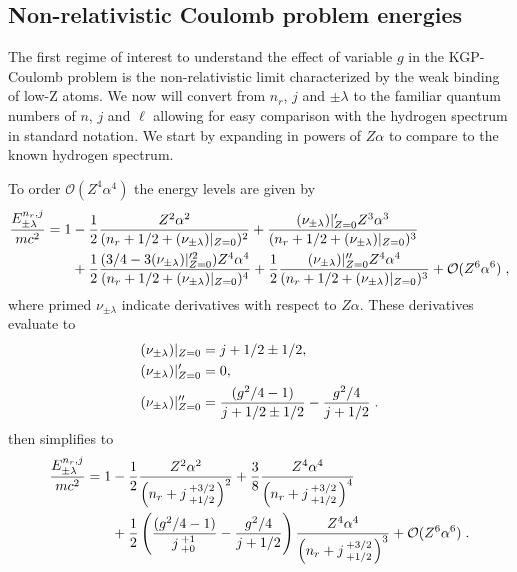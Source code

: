 \subsection{Non-relativistic Coulomb problem energies} \label{nonrel}
The first regime of interest to understand the effect of variable $g$ in the KGP-Coulomb problem is the non-relativistic limit characterized by the weak binding of low-Z atoms. We now will convert from $n_{r}$, $j$ and $\pm\lambda$ to the familiar quantum numbers of $n$, $j$ and $\ell$ allowing for easy comparison with the hydrogen spectrum in standard notation. We start by expanding  in powers of $Z\alpha$ to compare to the known hydrogen spectrum. 

To order $\mathcal{O}(Z^{4}\alpha^{4})$ the energy levels are given by
\begin{alignat}{1}
\label{nonrel01} \frac{E^{n_{r},j}_{\pm\lambda}}{mc^{2}}=1&-\frac{1}{2}\frac{Z^{2}\alpha^{2}}{(n_{r}+1/2+(\nu_{\pm\lambda})|_{Z=0})^{2}}+\frac{(\nu_{\pm\lambda})|_{Z=0}'Z^{3}\alpha^{3}}{(n_{r}+1/2+(\nu_{\pm\lambda})|_{Z=0})^{3}}\\ 
\notag&+\frac{1}{2}\frac{(3/4-3(\nu_{\pm\lambda})|_{Z=0}'^{2})Z^{4}\alpha^{4}}{(n_{r}+1/2+(\nu_{\pm\lambda})|_{Z=0})^{4}}+\frac{1}{2}\frac{(\nu_{\pm\lambda})|_{Z=0}^{\prime\prime} Z^{4}\alpha^{4}}{(n_{r}+1/2+(\nu_{\pm\lambda})|_{Z=0})^{3}}+\mathcal{O}(Z^{6}\alpha^{6})\;,\end{alignat}
where primed $\nu_{\pm\lambda}$ indicate derivatives with respect to $Z\alpha$. These derivatives evaluate to
\begin{alignat}{1}
\label{nonrel02} &(\nu_{\pm\lambda})|_{Z=0}=j+1/2\pm1/2,\\ \notag &(\nu_{\pm\lambda})|_{Z=0}'=0,\\ \notag &(\nu_{\pm\lambda})|_{Z=0}^{\prime\prime}=\frac{(g^{2}/4-1)}{j+1/2\pm1/2}-\frac{g^{2}/4}{j+1/2}\;.
\end{alignat}
 then simplifies to
\begin{alignat}{1}
\label{nonrel03} \frac{E^{n_{r},j}_{\pm\lambda}}{mc^{2}}=1&-\frac{1}{2}\frac{Z^{2}\alpha^{2}}{\left(n_{r}+j\begin{smallmatrix}+3/2 \\ +1/2\end{smallmatrix}\right)^{2}}+\frac{3}{8}\frac{Z^{4}\alpha^{4}}{\left(n_{r}+j\begin{smallmatrix}+3/2 \\ +1/2\end{smallmatrix}\right)^{4}}\\ 
\notag &+\frac{1}{2}\left(\frac{(g^{2}/4-1)}{j\begin{smallmatrix}+1 \\ +0\end{smallmatrix}}-\frac{g^{2}/4}{j+1/2}\right)\frac{Z^{4}\alpha^{4}}{\left(n_{r}+j\begin{smallmatrix}+3/2 \\ +1/2\end{smallmatrix}\right)^{3}}+\mathcal{O}(Z^{6}\alpha^{6})\;.
\end{alignat}
